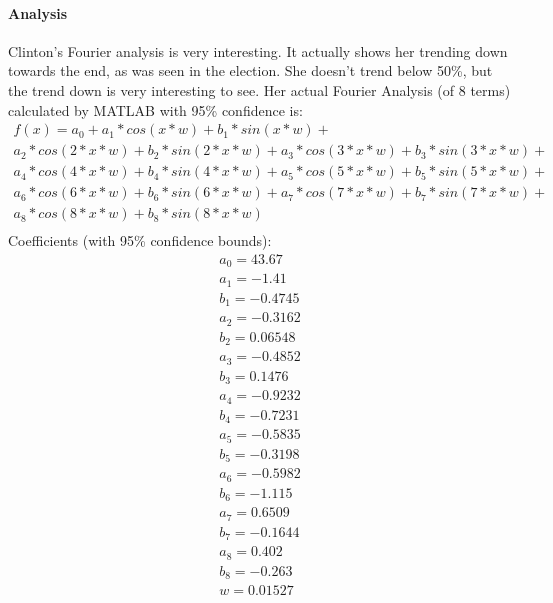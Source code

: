 \documentclass[twoside]{article}
\begin{document}
 \paragraph{Analysis} Clinton's Fourier analysis is very interesting. It actually shows her trending down towards the end, as was seen in the election.
  She doesn't trend below 50\%, but the trend down is very interesting to see. Her actual Fourier Analysis (of 8 terms) calculated by MATLAB with 95\% confidence is:
\newpage
\begin{gather*}
  f(x) =
           a_0 + a_1*cos(x*w) + b_1*sin(x*w) + \\
           a_2*cos(2*x*w) + b_2*sin(2*x*w) + a_3*cos(3*x*w) + b_3*sin(3*x*w) + \\
           a_4*cos(4*x*w) + b_4*sin(4*x*w) + a_5*cos(5*x*w) + b_5*sin(5*x*w) + \\
           a_6*cos(6*x*w) + b_6*sin(6*x*w) + a_7*cos(7*x*w) + b_7*sin(7*x*w) + \\
           a_8*cos(8*x*w) + b_8*sin(8*x*w)\\
\end{gather*}
Coefficients (with 95\% confidence bounds):
\begin{gather*}
   a_0 =       43.67 \\
   a_1 =       -1.41  \\
   b_1 =     -0.4745  \\
   a_2 =     -0.3162 \\
   b_2 =     0.06548  \\
   a_3 =     -0.4852  \\
   b_3 =      0.1476 \\
   a_4 =     -0.9232  \\
   b_4 =     -0.7231 \\
   a_5 =     -0.5835  \\
   b_5 =     -0.3198  \\
   a_6 =     -0.5982  \\
   b_6 =      -1.115  \\
   a_7 =      0.6509  \\
   b_7 =     -0.1644  \\
   a_8 =       0.402  \\
   b_8 =      -0.263  \\
   w =     0.01527  \\
\end{gather*}

\newpage
\end{document}
